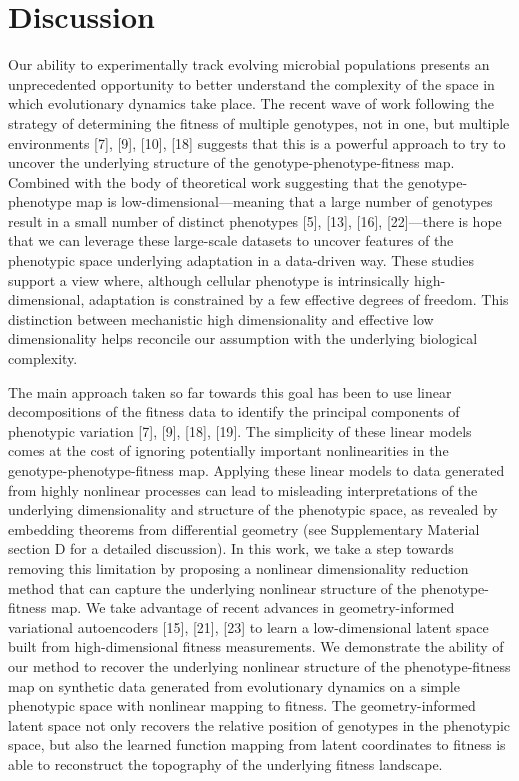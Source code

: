 \documentclass[
]{scrartcl}
\begin{document}
\begin{refsegment}
\begin{figure}
\end{figure}%

\section{Discussion}\label{discussion}

Our ability to experimentally track evolving microbial populations
presents an unprecedented opportunity to better understand the
complexity of the space in which evolutionary dynamics take place. The
recent wave of work following the strategy of determining the fitness of
multiple genotypes, not in one, but multiple environments {[}7{]},
{[}9{]}, {[}10{]}, {[}18{]} suggests that this is a powerful approach to
try to uncover the underlying structure of the
genotype-phenotype-fitness map. Combined with the body of theoretical
work suggesting that the genotype-phenotype map is
low-dimensional---meaning that a large number of genotypes result in a
small number of distinct phenotypes {[}5{]}, {[}13{]}, {[}16{]},
{[}22{]}---there is hope that we can leverage these large-scale datasets
to uncover features of the phenotypic space underlying adaptation in a
data-driven way.
\textcolor{tempcolor}{ These
studies support a view where, although cellular phenotype is
intrinsically high-dimensional, adaptation is constrained by a few
effective degrees of freedom. This distinction between mechanistic high
dimensionality and effective low dimensionality helps reconcile our
assumption with the underlying biological complexity. }

The main approach taken so far towards this goal has been to use linear
decompositions of the fitness data to identify the principal components
of phenotypic variation {[}7{]}, {[}9{]}, {[}18{]}, {[}19{]}. The
simplicity of these linear models comes at the cost of ignoring
potentially important nonlinearities in the genotype-phenotype-fitness
map. Applying these linear models to data generated from highly
nonlinear processes can lead to misleading interpretations of the
underlying dimensionality and structure of the phenotypic space, as
revealed by embedding theorems from differential geometry (see
Supplementary Material section D for a detailed discussion). In this
work, we take a step towards removing this limitation by proposing a
nonlinear dimensionality reduction method that can capture the
underlying nonlinear structure of the phenotype-fitness map. We take
advantage of recent advances in geometry-informed variational
autoencoders {[}15{]}, {[}21{]}, {[}23{]} to learn a low-dimensional
latent space built from high-dimensional fitness measurements. We
demonstrate the ability of our method to recover the underlying
nonlinear structure of the phenotype-fitness map on synthetic data
generated from evolutionary dynamics on a simple phenotypic space with
nonlinear mapping to fitness. The geometry-informed latent space not
only recovers the relative position of genotypes in the phenotypic
space, but also the learned function mapping from latent coordinates to
fitness is able to reconstruct the topography of the underlying fitness
landscape.


\end{refsegment}
\end{document}

